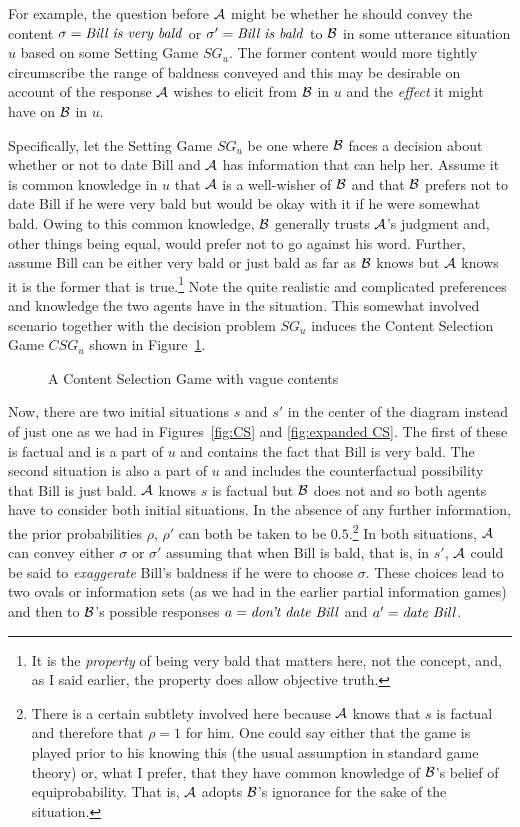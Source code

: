 For example, the question before $\cal A$ might be whether he should convey the content $\sigma = \hbox{\emph{Bill is very bald}}$ or $\sigma' = \hbox{\emph{Bill is bald}}$ to $\cal B$ in some utterance situation $u$ based on some Setting Game $SG_u$. The former content would more tightly circumscribe the range of baldness conveyed and this may be desirable on account of the response $\cal A$ wishes to elicit from $\cal B$ in $u$ and the \emph{effect} it might have on $\cal B$ in $u$. 

Specifically, let the Setting Game $SG_u$ be one where $\cal B$ faces a decision about whether or not to date Bill and $\cal A$ has information that can help her. Assume it is common knowledge in $u$ that $\cal A$ is a well-wisher of $\cal B$ and that $\cal B$ prefers not to date Bill if he were very bald but would be okay with it if he were somewhat bald. Owing to this common knowledge, $\cal B$ generally trusts $\cal A$'s judgment and, other things being equal, would prefer not to go against his word. Further, assume Bill can be either very bald or just bald as far as $\cal B$ knows but $\cal A$ knows it is the former that is true.\footnote{It is the \emph{property} of being very bald that matters here, not the concept, and, as I said earlier, the property does allow objective truth.} Note the quite realistic and complicated preferences and knowledge the two agents have in the situation. This somewhat involved scenario together with the decision problem $SG_u$ induces the Content Selection Game $CSG_u$ shown in Figure~\ref{fig:vague CS}.\largerpage

\begin{figure}[h] 
 
\caption{A Content Selection Game with vague contents}
\label{fig:vague CS}
\end{figure}

Now, there are two initial situations $s$ and $s'$ in the center of the diagram instead of just one as we had in Figures~\ref{fig:CS} and \ref{fig:expanded CS}. The first of these is factual and is a part of $u$ and contains the fact that Bill is very bald. The second situation is also a part of $u$ and includes the counterfactual possibility that Bill is just bald. $\cal A$ knows $s$ is factual but $\cal B$ does not and so both agents have to consider both initial situations. In the absence of any further information, the prior probabilities $\rho$, $\rho'$ can both be taken to be $0.5$.\footnote{There is a certain subtlety involved here because $\cal A$ knows that $s$ is factual and therefore that $\rho = 1$ for him. One could say either that the game is played prior to his knowing this (the usual assumption in standard game theory) or, what I prefer, that they have common knowledge of $\cal B$'s belief of equiprobability. That is, $\cal A$ adopts $\cal B$'s ignorance for the sake of the situation.} In both situations, $\cal A$ can convey either $\sigma$ or $\sigma'$ assuming that when Bill is bald, that is, in $s'$, $\cal A$ could be said to \emph{exaggerate} Bill's baldness if he were to choose $\sigma$. These choices lead to two ovals or information sets (as we had in the earlier partial information games) and then to $\cal B$'s possible responses $a = \hbox{\emph{don't date Bill}}$ and $a' = \hbox{\emph{date Bill}}$.

